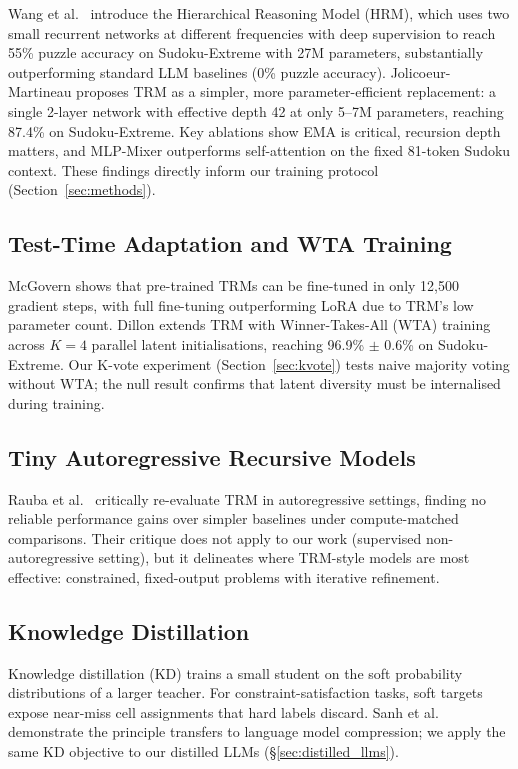\documentclass{article}
\begin{document}
Wang et al.\  introduce the Hierarchical Reasoning Model (HRM), which uses two small recurrent networks at different frequencies with deep supervision to reach 55\% puzzle accuracy on Sudoku-Extreme with 27M parameters, substantially outperforming standard LLM baselines (0\% puzzle accuracy). Jolicoeur-Martineau  proposes TRM as a simpler, more parameter-efficient replacement: a single 2-layer network with effective depth 42 at only 5--7M parameters, reaching 87.4\% on Sudoku-Extreme. Key ablations show EMA is critical, recursion depth matters, and MLP-Mixer outperforms self-attention on the fixed 81-token Sudoku context. These findings directly inform our training protocol (Section~\ref{sec:methods}).

\subsection{Test-Time Adaptation and WTA Training}

McGovern  shows that pre-trained TRMs can be fine-tuned in only 12{,}500 gradient steps, with full fine-tuning outperforming LoRA due to TRM's low parameter count. Dillon  extends TRM with Winner-Takes-All (WTA) training across $K=4$ parallel latent initialisations, reaching 96.9\% $\pm$ 0.6\% on Sudoku-Extreme. Our K-vote experiment (Section~\ref{sec:kvote}) tests naive majority voting without WTA; the null result confirms that latent diversity must be internalised during training.

\subsection{Tiny Autoregressive Recursive Models}

Rauba et al.\  critically re-evaluate TRM in autoregressive settings, finding no reliable performance gains over simpler baselines under compute-matched comparisons. Their critique does not apply to our work (supervised non-autoregressive setting), but it delineates where TRM-style models are most effective: constrained, fixed-output problems with iterative refinement.

\subsection{Knowledge Distillation}

Knowledge distillation (KD) \cite{Hinton2015} trains a small student on the soft probability distributions of a larger teacher. For constraint-satisfaction tasks, soft targets expose near-miss cell assignments that hard labels discard. Sanh et al.\  demonstrate the principle transfers to language model compression; we apply the same KD objective to our distilled LLMs (\S\ref{sec:distilled_llms}).
\end{document}
